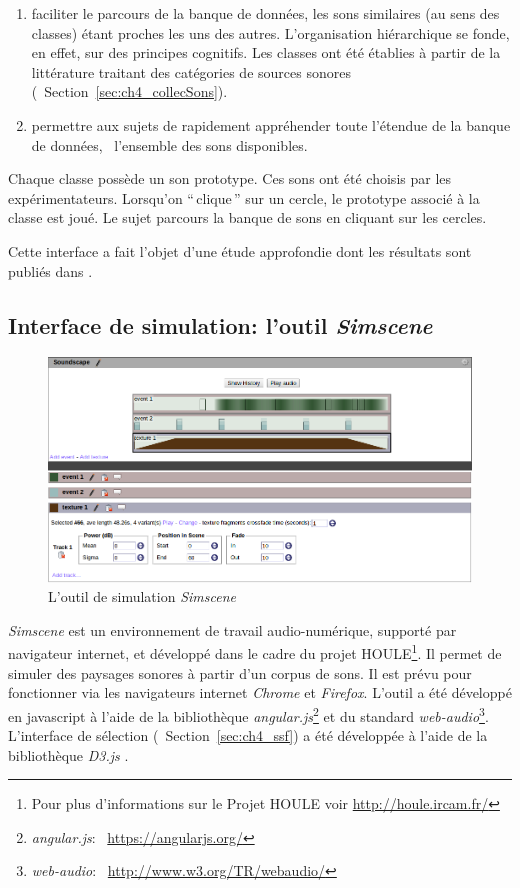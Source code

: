 \begin{enumerate}
\item faciliter le parcours de la banque de données, les sons similaires (au sens des classes) étant proches les uns des autres. L'organisation hiérarchique se fonde, en effet, sur des principes cognitifs. Les classes ont été établies à partir de la littérature traitant des catégories de sources sonores (\cf~Section~\ref{sec:ch4_collecSons}).
\item permettre aux sujets de rapidement appréhender toute l'étendue de la banque de données, \ie~l'ensemble des sons disponibles.
\end{enumerate}

Chaque classe possède un son prototype. Ces sons ont été choisis par les expérimentateurs. Lorsqu’on ``\,clique\,'' sur un cercle, le prototype associé à la classe est joué. Le sujet parcours la banque de sons en cliquant sur les cercles.

Cette interface a fait l'objet d'une étude approfondie dont les résultats sont publiés dans \citep{lafay2016JAES}. \\


\subsection{Interface de simulation: l'outil \emph{Simscene}}
\label{sec:ch4_simscene}

\begin{figure}[t]
        \myfloatalign
        \includegraphics[width=.8\linewidth]{gfx/ch_4/simscene}
       \caption{L'outil de simulation \emph{Simscene}}\label{fig:simscene}
\end{figure}

\emph{Simscene} est un environnement de travail audio-numérique, supporté par navigateur internet, et développé dans le cadre du projet HOULE\footnote{Pour plus d’informations sur le Projet HOULE voir \url{http://houle.ircam.fr/}}. Il permet de simuler des paysages sonores à partir d'un corpus de sons. Il est prévu pour fonctionner via les navigateurs internet \emph{Chrome} et \emph{Firefox}. L'outil a été développé en javascript à l'aide de la bibliothèque \emph{angular.js}\footnote{\emph{angular.js}: \cf~\url{https://angularjs.org/}} et du standard \emph{web-audio}\footnote{\emph{web-audio}: \cf~\url{http://www.w3.org/TR/webaudio/}}. L'interface de sélection (\cf~Section~\ref{sec:ch4_ssf}) a été développée à l'aide de la bibliothèque \emph{D3.js} \citep{d32011}.

